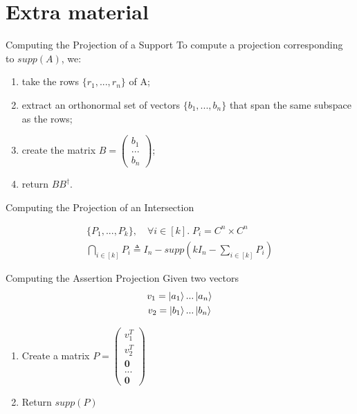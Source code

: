 \documentclass[11pt,svgnames,smaller,aspectratio=43,english]{beamer}
\begin{document}
\section*{Extra material}
\begin{frame}{Computing the Projection of a Support}
	To compute a projection corresponding to $supp(A)$, we:
	\begin{enumerate}
		\item take the rows $\{r_1, ..., r_n\}$ of A;
		\item extract an orthonormal set of vectors $\{b_1, ..., b_n\}$ that span the same subspace as the rows;
		\item create the matrix $B = \begin{pmatrix}
			b_1 \\ ... \\ b_n
		\end{pmatrix}$;
		\item return $BB^\dagger$.
	\end{enumerate}
\end{frame}

\begin{frame}{Computing the Projection of an Intersection}

	\begin{gather*}
		\{P_1, ..., P_k\},\quad \forall i\in [k].\; P_i = C^n \times C^n\\
		\bigcap_{i\in [k]} P_i \triangleq I_n - supp(kI_n - \sum_{i\in [k]} P_i)
	\end{gather*}
\end{frame}

\begin{frame}{Computing the Assertion Projection}
	Given two vectors
	\begin{gather*}
		v_1 = \ket{a_1}...\ket{a_n}\\
		v_2 = \ket{b_1}...\ket{b_n}
	\end{gather*}
	\begin{enumerate}
		\item Create a matrix $P = \begin{pmatrix}
			v_1^T \\ v_2^T \\ \mathbf{0} \\ ... \\ \mathbf{0}
		\end{pmatrix}$
		\item Return $supp(P)$
	\end{enumerate}
\end{frame}
\end{document}
